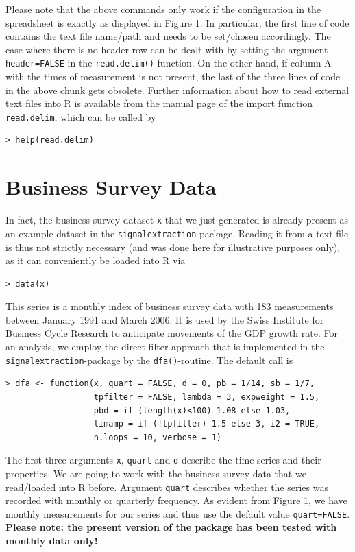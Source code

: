 \documentclass[a4paper]{article}
\begin{document}
Please note that the above commands only work if the configuration in
the spreadsheet is exactly as displayed in Figure 1. In particular,
the first line of code contains the text file name/path and needs to
be set/chosen accordingly. The case where there is no header row can
be dealt with by setting the argument \texttt{header=FALSE} in the
\texttt{read.delim()} function. On the other hand, if column A with
the times of measurement is not present, the last of the three lines
of code in the above chunk gets obsolete. Further information about
how to read external text files into R is available from the manual
page of the import function \texttt{read.delim}, which can be called
by

\begin{verbatim}
> help(read.delim)
\end{verbatim}

\section{Business Survey Data}

In fact, the business survey dataset \texttt{x} that we just generated
is already present as an example dataset in the
\texttt{signalextraction}-package. Reading it from a text file is thus
not strictly necessary (and was done here for illustrative purposes
only), as it can conveniently be loaded into R via

\begin{verbatim}
> data(x)
\end{verbatim}

This series is a monthly index of business survey data with 183
measurements between January 1991 and March 2006. It is used by the
Swiss Institute for Business Cycle Research to anticipate movements of
the GDP growth rate. For an analysis, we employ the direct filter
approach that is implemented in the \texttt{signalextraction}-package
by the \texttt{dfa()}-routine. The default call is

\begin{verbatim}
> dfa <- function(x, quart = FALSE, d = 0, pb = 1/14, sb = 1/7,
                  tpfilter = FALSE, lambda = 3, expweight = 1.5, 
                  pbd = if (length(x)<100) 1.08 else 1.03, 
                  limamp = if (!tpfilter) 1.5 else 3, i2 = TRUE, 
                  n.loops = 10, verbose = 1)
\end{verbatim}

The first three arguments \texttt{x}, \texttt{quart} and \texttt{d}
describe the time series and their properties. We are going to work
with the business survey data that we read/loaded into R before. 
Argument \texttt{quart} describes whether the series was recorded with
monthly or quarterly frequency. As evident from Figure 1, we have
monthly measurements for our series and thus use the default value
\texttt{quart=FALSE}. \textbf{Please note: the present version of the
  package has been tested with monthly data only!} \\
\end{document}
